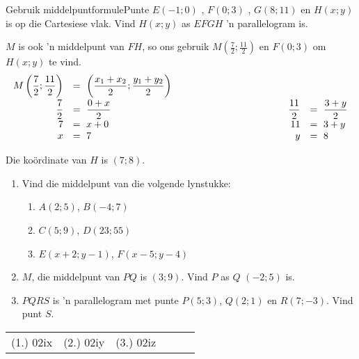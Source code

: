 \begin{wex}{Gebruik middelpuntformule}{Punte $E(-1;0)$ , $F(0;3)$ , $G(8;11)$ en $H(x;y)$ is op die Cartesiese vlak. Vind $H(x;y)$ as $EFGH$ 'n parallelogram is.}
{
$M$ is ook 'n middelpunt van $FH$, so ons gebruik $M(\frac{7}{2};\frac{11}{2})$ en $F(0;3)$ om $H(x;y)$ te vind.
\begin{equation*}
\begin{array}{rllrl}
 M\left(\dfrac{7}{2};\dfrac{11}{2}\right) &=~\left(\dfrac{x_1+x_2}{2}; \dfrac{y_1+y_2}{2}\right)\\[8pt]
\dfrac{7}{2}&=~\dfrac{0+x}{2}&\hskip10em&\dfrac{11}{2}&=~\dfrac{3+y}{2}\\
7&=~x+0&&11&=~3+y\\
x&=~7&&y&=~8\\
\end{array}
\end{equation*}

Die ko\"ordinate van $H$ is $(7;8)$.
}
\end{wex}
\begin{exercises}{}
\begin{enumerate}[itemsep=5pt, label=\textbf{\arabic*}. ]
\item Vind die middelpunt van die volgende lynstukke:
  \begin{enumerate}[noitemsep, label=\textbf{(\alph*)} ]
\item $A(2;5)$, $B(-4;7)$
\item $C(5;9)$, $D(23;55)$
\item $E(x+2;y-1)$, $F(x-5;y-4)$
\end{enumerate}

\item $M$, die middelpunt van $PQ$ is $(3;9)$. Vind $P$ as $Q$  $(-2;5)$ is.
\item $PQRS$ is 'n parallelogram met punte $P(5;3)$, $Q(2;1)$ en $R(7;-3)$. Vind punt $S$.

\end{enumerate}
\par \practiceinfo
\par \begin{tabular}[h]{cccccc}
(1.)	02ix	&
(2.)	02iy	&
(3.)	02iz	&
\end{tabular}
\end{exercises}    

